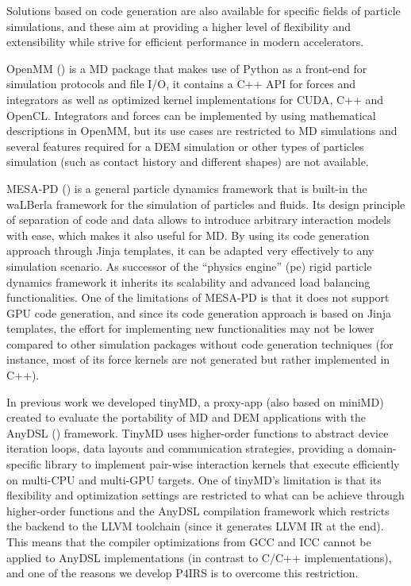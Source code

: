 \documentclass[Afour,sageh,times]{sagej}
\begin{document}
Solutions based on code generation are also available for specific fields of particle simulations, and these aim at providing a higher level of flexibility and extensibility while strive for efficient performance in modern accelerators.

OpenMM (\cite{openmm}) is a \ac{MD} package that makes use of Python as a front-end for simulation protocols and file I/O, it contains a C++ API for forces and integrators as well as optimized kernel implementations for CUDA, C++ and OpenCL.
Integrators and forces can be implemented by using mathematical descriptions in OpenMM, but its use cases are restricted to \ac{MD} simulations and several features required for a DEM simulation or other types of particles simulation (such as contact history and different shapes) are not available.

MESA-PD (\cite{mesapd3}) is a general particle dynamics framework that is built-in the waLBerla framework for the simulation of particles and fluids.
Its design principle of separation of code and data allows to introduce arbitrary interaction models with ease, which makes it also useful for \ac{MD}.
By using its code generation approach through Jinja templates, it can be adapted very effectively to any simulation scenario.
As successor of the ``physics engine'' (pe) rigid particle dynamics framework it inherits its scalability and advanced load balancing functionalities.
One of the limitations of MESA-PD is that it does not support GPU code generation, and since its code generation approach is based on Jinja templates, the effort for implementing new functionalities may not be lower compared to other simulation packages without code generation techniques (for instance, most of its force kernels are not generated but rather implemented in C++).

In previous work we developed tinyMD, a proxy-app (also based on miniMD) created to evaluate the portability of MD and DEM applications with the AnyDSL (\cite{anydsl1,anydsl2}) framework.
TinyMD uses higher-order functions to abstract device iteration loops, data layouts and communication strategies, providing a domain-specific library to implement pair-wise interaction kernels that execute efficiently on multi-CPU and multi-GPU targets.
One of tinyMD's limitation is that its flexibility and optimization settings are restricted to what can be achieve through higher-order functions and the AnyDSL compilation framework which restricts the backend to the LLVM toolchain (since it generates LLVM IR at the end).
This means that the compiler optimizations from GCC and ICC cannot be applied to AnyDSL implementations (in contrast to C/C++ implementations), and one of the reasons we develop P4IRS is to overcome this restriction.
\end{document}
